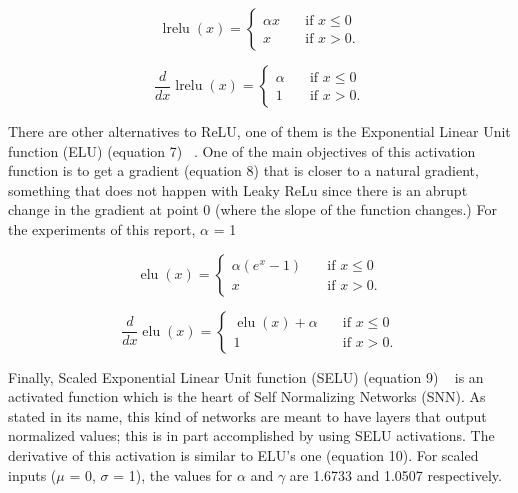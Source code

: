 \documentclass{article}
\DeclareMathOperator{\lrelu}{lrelu}
\DeclareMathOperator{\elu}{elu}
\begin{document}
\begin{equation}
  \lrelu(x) =
     \begin{cases} 
      \alpha x      & \quad \text{if } x \leq  0 \\
      x       & \quad \text{if } x > 0 .
    \end{cases} 
\end{equation}

\begin{equation}
  \frac{d}{dx} \lrelu(x) =
     \begin{cases} 
      \alpha      & \quad \text{if } x \leq  0 \\
      1       & \quad \text{if } x > 0 .
    \end{cases} 
\end{equation}

There are other alternatives to ReLU, one of them is the Exponential Linear Unit function (ELU) (equation 7) ~\citep{act_elu}. One of the main objectives of this activation function is to get a gradient (equation 8) that is closer to a natural gradient, something that does not happen with Leaky ReLu since there is an abrupt change in the gradient at point 0 (where the slope of the function changes.) For the experiments of this report, \(\alpha\) = 1

\begin{equation}
  \elu(x) =
     \begin{cases} 
      \alpha (e^{x} - 1)     & \quad \text{if } x \leq  0 \\
      x       & \quad \text{if } x > 0 .
    \end{cases} 
\end{equation}

\begin{equation}
  \frac{d}{dx} \elu(x) =
     \begin{cases} 
      \elu(x) + \alpha      & \quad \text{if } x \leq  0 \\
      1       & \quad \text{if } x > 0 .
    \end{cases} 
\end{equation}

Finally, Scaled Exponential Linear Unit function (SELU) (equation 9) ~\citep{act_selu} is an activated function which is the heart of Self Normalizing Networks (SNN). As stated in its name, this kind of networks are meant to have layers that output normalized values; this is in part accomplished by using SELU activations. The derivative of this activation is similar to ELU's one (equation 10). For scaled inputs (\(\mu\) = 0, \(\sigma\) = 1), the values for \(\alpha\) and \(\gamma\) are 1.6733 and 1.0507 respectively.
\end{document}
